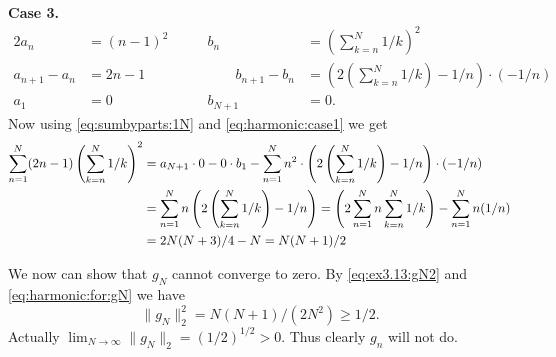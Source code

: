 \begin{enumerate}
\textbf{Case 3.}
\begin{alignat*}{2}
a_n &= (n-1)^2  \qquad &           b_n &= \left(\sum_{k=n}^N 1/k\right)^2 \\
a_{n+1} - a_n &= 2n-1 \qquad & \qquad
  b_{n+1} - b_n &=
    \left(2\left(\sum_{k=n}^N 1/k\right) - 1/n\right)\cdot(-1/n) \\
a_1 &= 0           &               b_{N+1} &= 0.
\end{alignat*}
Now using  \eqref{eq:sumbyparts:1N} and \eqref{eq:harmonic:case1} we get
\begin{align}
\sum_{n=1}^N (2n-1) \left(\sum_{k=n}^N 1/k\right)^2
&= a_{N+1}\cdot 0 - 0 \cdot b_1
   - \sum_{n=1}^N n^2
     \cdot
     \left(2\left(\sum_{k=n}^N 1/k\right) - 1/n\right)\cdot(-1/n) \notag \\
&= \sum_{n=1}^N n \left(2\left(\sum_{k=n}^N 1/k\right) - 1/n\right)
 = \left(2\sum_{n=1}^N n \sum_{k=n}^N 1/k\right)
    - \sum_{n=1}^N n(1/n) \notag \\
&= 2N(N+3)/4 - N
 = N(N+1)/2 \label{eq:harmonic:for:gN}
\end{align}

We now can show that \(g_N\) cannot converge to zero.
By \eqref{eq:ex3.13:gN2} and \eqref{eq:harmonic:for:gN} we have
\begin{equation*}
\|g_N\|_2^2 = N(N+1)/(2N^2) \geq 1/2.
\end{equation*}
Actually \(\lim_{N\to\infty} \|g_N\|_2 = (1/2)^{1/2} > 0\).
Thus clearly \(g_n\) will not do.


\end{enumerate}
